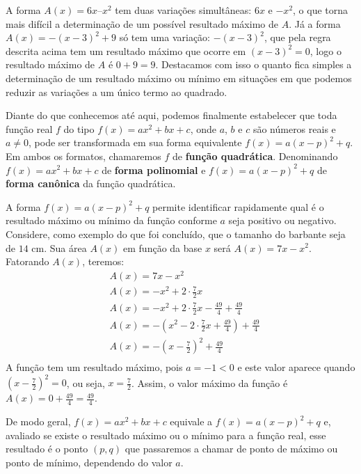 A forma \(A(x) = 6x – x^2\) tem duas variações simultâneas: \(6x\) e \(-x^2\), o que torna mais difícil a determinação de um possível resultado máximo de \(A\). Já a forma \(A(x)=-(x-3)^2 +9\) só tem uma variação: \(-(x-3)^2\), que pela regra descrita acima tem um resultado máximo que ocorre em \((x-3)^2=0\), logo o resultado máximo de \(A\) é \(0+9=9\). Destacamos com isso o quanto fica simples a determinação de um resultado máximo ou mínimo em situações em que podemos reduzir as variações a um único termo ao quadrado.

Diante do que conhecemos até aqui, podemos finalmente estabelecer que toda função real \(f\) do tipo \(f(x)=ax^{2}+bx+c\), onde \(a\), \(b\) e \(c\) são números reais e \(a \neq 0\), pode ser transformada em sua forma equivalente \(f(x)=a(x-p)^{2}+q\). Em ambos os formatos, chamaremos \(f\) de \textbf{função quadrática}. Denominando \(f(x)=ax^{2}+bx+c\) de \textbf{forma polinomial} e \(f(x)=a(x-p)^{2}+q\) de \textbf{forma canônica} da função quadrática.

A forma \(f(x)=a(x-p)^{2}+q\) permite identificar rapidamente  qual é o resultado máximo ou mínimo da função conforme \(a\) seja positivo ou negativo.
Considere, como exemplo do que foi concluído, que o tamanho do barbante seja de \(14\) cm. Sua área \(A(x)\) em função da base \(x\) será \(A(x)=7x-x^{2}\). Fatorando \(A(x)\), teremos:
\begin{equation*}
\begin{split}& A(x)= 7x-x^{2}\\
& A(x)=-x^{2}+2 \cdot \frac{7}{2}x\\
& A(x)=-x^{2}+2 \cdot \frac{7}{2}x - \frac{49}{4} + \frac{49}{4}\\
& A(x)=-\left(x^{2}-2 \cdot \frac{7}{2}x + \frac{49}{4}\right) + \frac{49}{4}\\
& A(x)=- \left(x - \frac{7}{2} \right )^{2}+ \frac{49}{4}\\\end{split}
\end{equation*}
A função tem um resultado máximo, pois \(a=-1<0\) e este valor aparece quando \(\displaystyle\left(x-\frac{7}{2}\right)^{2}=0\), ou seja, \(x=\frac{7}{2}\). Assim, o valor máximo da função é \(\displaystyle A(x)=0+\frac{49}{4}=\frac{49}{4}\).

De modo geral, \(f(x)=ax^{2}+bx+c\) equivale a \(f(x)=a(x-p)^{2}+q\) e, avaliado se existe o resultado máximo ou o mínimo para a função real, esse resultado é o ponto \((p,q)\) que passaremos a chamar de ponto de máximo ou ponto de mínimo, dependendo do valor \(a\).

